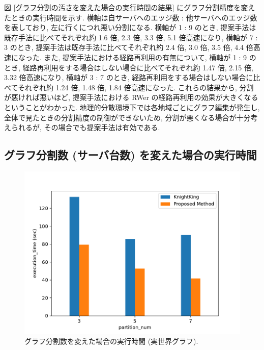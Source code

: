 図 \ref{グラフ分割の汚さを変えた場合の実行時間の結果} にグラフ分割精度を変えたときの実行時間を示す. 横軸は自サーバへのエッジ数 : 他サーバへのエッジ数を表しており, 左に行くにつれ悪い分割になる. 横軸が 1 : 9 のとき, 提案手法は既存手法に比べてそれぞれ約 1.6 倍, 2.3 倍, 3.3 倍, 5.1 倍高速になり, 横軸が 7 : 3 のとき, 提案手法は既存手法に比べてそれぞれ約 2.4 倍, 3.0 倍, 3.5 倍, 4.4 倍高速になった. また, 提案手法における経路再利用の有無について, 横軸が 1 : 9 のとき, 経路再利用をする場合はしない場合に比べてそれぞれ約 1.47 倍, 2.15 倍, 3.32 倍高速になり, 横軸が 3 : 7 のとき, 経路再利用をする場合はしない場合に比べてそれぞれ約 1.24 倍, 1.48 倍, 1.84 倍高速になった. これらの結果から, 分割が悪ければ悪いほど, 提案手法における RWer の経路再利用の効果が大きくなるということがわかった. 地理的分散環境下では各地域ごとにグラフ編集が発生し, 全体で見たときの分割精度の制御ができないため, 分割が悪くなる場合が十分考えられるが, その場合でも提案手法は有効である. 

\subsection{グラフ分割数 (サーバ台数) を変えた場合の実行時間}\label{グラフ分割数を変えた場合の実行時間}

\begin{figure}[t]
    \centering
    \includegraphics[scale=0.8]{figure/Kn_vs_AR_partition_num_LiveJournal.pdf}
    \caption{グラフ分割数を変えた場合の実行時間 (実世界グラフ).}
    \label{グラフ分割数を変えた場合の実行時間 (実世界グラフ)}
\end{figure}

